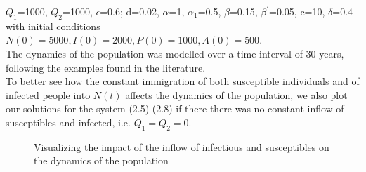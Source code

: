 $Q_{1}$=1000, $Q_{2}$=1000, $\epsilon$=0.6; d=0.02, $\alpha$=1, $\alpha_{1}$=0.5, $\beta$=0.15, $\beta^{\prime}$=0.05, c=10, $\delta$=0.4\\

with initial conditions\\
$N(0)=5000, I(0)=2000, P(0)=1000, A(0)=500$.\\
The dynamics of the population was modelled over a time interval of 30 years, following the examples found in the literature.\\

To better see how the constant immigration of both susceptible individuals and of infected people into $N(t)$ affects the dynamics of the population, we also plot our solutions for the system (2.5)-(2.8) if there there was no constant inflow of susceptibles and infected, i.e. $Q_{1}=Q_{2}=0$.

\begin{figure}[H]
\end{figure}
\begin{figure}
	\caption{Visualizing the impact of the inflow of infectious and susceptibles on the dynamics of the population}
\end{figure}

